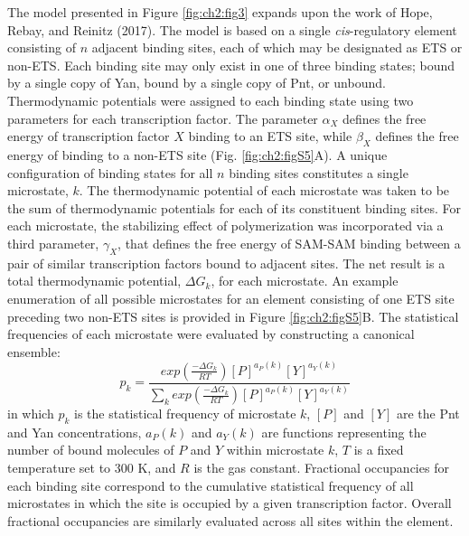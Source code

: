 The model presented in Figure \ref{fig:ch2:fig3} expands upon the work of Hope, Rebay, and Reinitz (2017). The model is based on a single \textit{cis}-regulatory element consisting of $n$ adjacent binding sites, each of which may be designated as ETS or non-ETS. Each binding site may only exist in one of three binding states; bound by a single copy of Yan, bound by a single copy of Pnt, or unbound. Thermodynamic potentials were assigned to each binding state using two parameters for each transcription factor. The parameter $\alpha_X$ defines the free energy of transcription factor $X$ binding to an ETS site, while $\beta_X$ defines the free energy of binding to a non-ETS site (Fig. \ref{fig:ch2:figS5}A). A unique configuration of binding states for all $n$ binding sites constitutes a single microstate, $k$. The thermodynamic potential of each microstate was taken to be the sum of thermodynamic potentials for each of its constituent binding sites. For each microstate, the stabilizing effect of polymerization was incorporated via a third parameter, $\gamma_X$, that defines the free energy of SAM-SAM binding between a pair of similar transcription factors bound to adjacent sites. The net result is a total thermodynamic potential, $\Delta G_k$, for each microstate. An example enumeration of all possible microstates for an element consisting of one ETS site preceding two non-ETS sites is provided in Figure \ref{fig:ch2:figS5}B. The statistical frequencies of each microstate were evaluated by constructing a canonical ensemble:
\begin{equation}
p_k = \frac{\displaystyle exp( \frac{-\Delta G_k}{RT} ) [P]^{a_P(k)}[Y]^{a_Y(k)} } {\displaystyle \sum_{k} {exp(\frac{-\Delta G_k}{RT})[P]^{a_P(k)}[Y]^{a_Y(k)}}}
\end{equation}
in which $p_k$ is the statistical frequency of microstate $k$, $[P]$ and $[Y]$ are the Pnt and Yan concentrations, $a_P(k)$ and $a_Y(k)$ are functions representing the number of bound molecules of $P$ and $Y$ within microstate $k$, $T$ is a fixed temperature set to 300 K, and $R$ is the gas constant. Fractional occupancies for each binding site correspond to the cumulative statistical frequency of all microstates in which the site is occupied by a given transcription factor. Overall fractional occupancies are similarly evaluated across all sites within the element.

